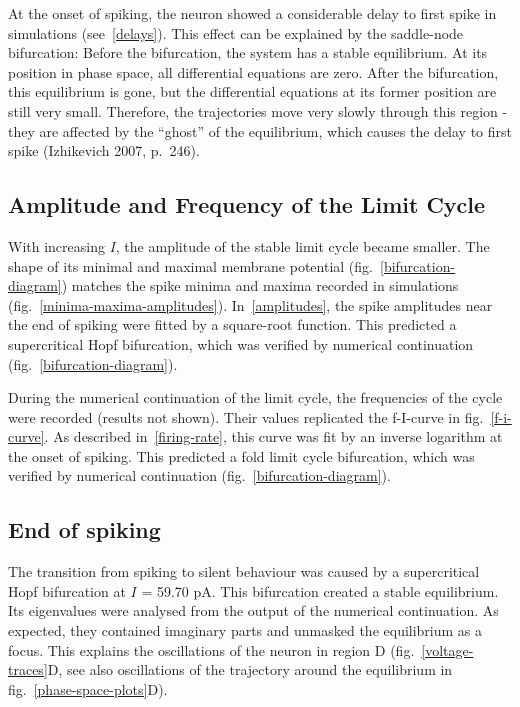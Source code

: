 \documentclass[12pt,a4paper,]{report}
\begin{document}
At the onset of spiking, the neuron showed a considerable delay to first
spike in simulations (see~\ref{delays}). This effect can be explained by
the saddle-node bifurcation: Before the bifurcation, the system has a
stable equilibrium. At its position in phase space, all differential
equations are zero. After the bifurcation, this equilibrium is gone, but
the differential equations at its former position are still very small.
Therefore, the trajectories move very slowly through this region - they
are affected by the ``ghost'' of the equilibrium, which causes the delay
to first spike (Izhikevich 2007, p.~246).

\subsection{Amplitude and Frequency of the Limit
Cycle}\label{amplitude-and-frequency-of-the-limit-cycle}

With increasing $I$, the amplitude of the stable limit cycle became
smaller. The shape of its minimal and maximal membrane potential
(fig.~\ref{bifurcation-diagram}) matches the spike minima and maxima
recorded in simulations (fig.~\ref{minima-maxima-amplitudes}).
In~\ref{amplitudes}, the spike amplitudes near the end of spiking were
fitted by a square-root function. This predicted a supercritical Hopf
bifurcation, which was verified by numerical continuation
(fig.~\ref{bifurcation-diagram}).

During the numerical continuation of the limit cycle, the frequencies of
the cycle were recorded (results not shown). Their values replicated the
f-I-curve in fig.~\ref{f-i-curve}. As described in~\ref{firing-rate},
this curve was fit by an inverse logarithm at the onset of spiking. This
predicted a fold limit cycle bifurcation, which was verified by
numerical continuation (fig.~\ref{bifurcation-diagram}).

\subsection{End of spiking}\label{end-of-spiking}

The transition from spiking to silent behaviour was caused by a
supercritical Hopf bifurcation at $I$ = 59.70 pA. This bifurcation
created a stable equilibrium. Its eigenvalues were analysed from the
output of the numerical continuation. As expected, they contained
imaginary parts and unmasked the equilibrium as a focus. This explains
the oscillations of the neuron in region D (fig.~\ref{voltage-traces}D,
see also oscillations of the trajectory around the equilibrium in
fig.~\ref{phase-space-plots}D).
\end{document}
